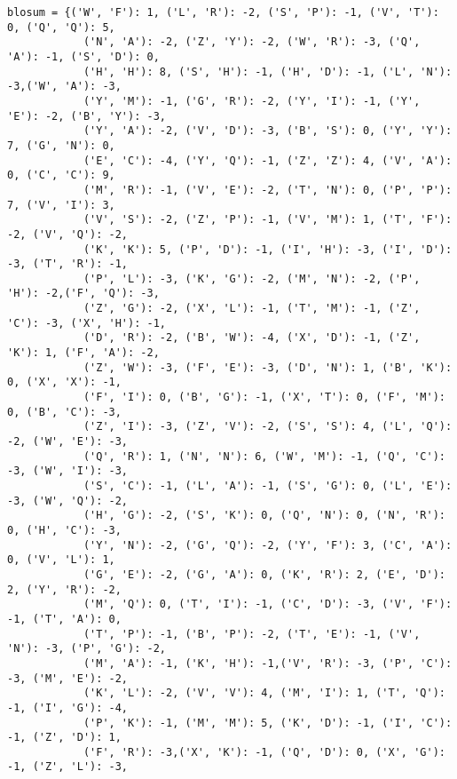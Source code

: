 \lstset{basicstyle=\footnotesize,style=myCustomMatlabStyle}
\begin{lstlisting}
blosum = {('W', 'F'): 1, ('L', 'R'): -2, ('S', 'P'): -1, ('V', 'T'): 0, ('Q', 'Q'): 5, 
            ('N', 'A'): -2, ('Z', 'Y'): -2, ('W', 'R'): -3, ('Q', 'A'): -1, ('S', 'D'): 0, 
            ('H', 'H'): 8, ('S', 'H'): -1, ('H', 'D'): -1, ('L', 'N'): -3,('W', 'A'): -3,
            ('Y', 'M'): -1, ('G', 'R'): -2, ('Y', 'I'): -1, ('Y', 'E'): -2, ('B', 'Y'): -3,
            ('Y', 'A'): -2, ('V', 'D'): -3, ('B', 'S'): 0, ('Y', 'Y'): 7, ('G', 'N'): 0,
            ('E', 'C'): -4, ('Y', 'Q'): -1, ('Z', 'Z'): 4, ('V', 'A'): 0, ('C', 'C'): 9,
            ('M', 'R'): -1, ('V', 'E'): -2, ('T', 'N'): 0, ('P', 'P'): 7, ('V', 'I'): 3, 
            ('V', 'S'): -2, ('Z', 'P'): -1, ('V', 'M'): 1, ('T', 'F'): -2, ('V', 'Q'): -2, 
            ('K', 'K'): 5, ('P', 'D'): -1, ('I', 'H'): -3, ('I', 'D'): -3, ('T', 'R'): -1, 
            ('P', 'L'): -3, ('K', 'G'): -2, ('M', 'N'): -2, ('P', 'H'): -2,('F', 'Q'): -3, 
            ('Z', 'G'): -2, ('X', 'L'): -1, ('T', 'M'): -1, ('Z', 'C'): -3, ('X', 'H'): -1, 
            ('D', 'R'): -2, ('B', 'W'): -4, ('X', 'D'): -1, ('Z', 'K'): 1, ('F', 'A'): -2,
            ('Z', 'W'): -3, ('F', 'E'): -3, ('D', 'N'): 1, ('B', 'K'): 0, ('X', 'X'): -1, 
            ('F', 'I'): 0, ('B', 'G'): -1, ('X', 'T'): 0, ('F', 'M'): 0, ('B', 'C'): -3, 
            ('Z', 'I'): -3, ('Z', 'V'): -2, ('S', 'S'): 4, ('L', 'Q'): -2, ('W', 'E'): -3, 
            ('Q', 'R'): 1, ('N', 'N'): 6, ('W', 'M'): -1, ('Q', 'C'): -3, ('W', 'I'): -3, 
            ('S', 'C'): -1, ('L', 'A'): -1, ('S', 'G'): 0, ('L', 'E'): -3, ('W', 'Q'): -2, 
            ('H', 'G'): -2, ('S', 'K'): 0, ('Q', 'N'): 0, ('N', 'R'): 0, ('H', 'C'): -3,
            ('Y', 'N'): -2, ('G', 'Q'): -2, ('Y', 'F'): 3, ('C', 'A'): 0, ('V', 'L'): 1, 
            ('G', 'E'): -2, ('G', 'A'): 0, ('K', 'R'): 2, ('E', 'D'): 2, ('Y', 'R'): -2, 
            ('M', 'Q'): 0, ('T', 'I'): -1, ('C', 'D'): -3, ('V', 'F'): -1, ('T', 'A'): 0, 
            ('T', 'P'): -1, ('B', 'P'): -2, ('T', 'E'): -1, ('V', 'N'): -3, ('P', 'G'): -2, 
            ('M', 'A'): -1, ('K', 'H'): -1,('V', 'R'): -3, ('P', 'C'): -3, ('M', 'E'): -2, 
            ('K', 'L'): -2, ('V', 'V'): 4, ('M', 'I'): 1, ('T', 'Q'): -1, ('I', 'G'): -4,
            ('P', 'K'): -1, ('M', 'M'): 5, ('K', 'D'): -1, ('I', 'C'): -1, ('Z', 'D'): 1, 
            ('F', 'R'): -3,('X', 'K'): -1, ('Q', 'D'): 0, ('X', 'G'): -1, ('Z', 'L'): -3, 

\end{lstlisting}
